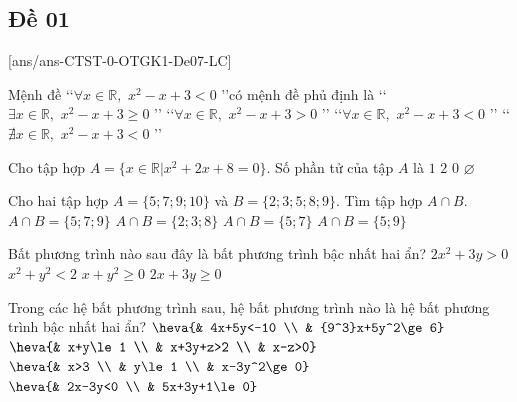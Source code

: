 \subsection{Đề 01}
[ans/ans-CTST-0-OTGK1-De07-LC]
\caulc
\begin{ex}%
	Mệnh đề \lq\lq $\forall x\in \mathbb{R},\,\,x^2-x+3<0$ \rq\rq có mệnh đề phủ định là
	\choice
	{\True  \lq\lq $\exists x \in \mathbb{R},\,\,x^2-x+3\ge 0$ \rq\rq}
	{\lq\lq $\forall x \in \mathbb{R},\,\,x^2-x+3>0$ \rq\rq}
	{\lq\lq $\forall x \in \mathbb{R},\,\,x^2-x+3<0$ \rq\rq}
	{\lq\lq $\nexists x \in \mathbb{R},\,\,x^2-x+3<0$ \rq\rq}
\end{ex}
\begin{ex}%
	Cho tập hợp $A=\{x\in \mathbb{R}|x^2+2x+8=0\}$. Số phần tử của tập $A$ là
	\choice
	{$1$}
	{$2$}
	{\True $0$}
	{$\varnothing$}
\end{ex}
\begin{ex}%
	Cho hai tập hợp $A=\{5;7;9;10\}$ và $B=\{2;3;5;8;9\}$. Tìm tập hợp $A\cap B$.
	\choice
	{$A\cap B=\{5;7;9\}$}
	{$A\cap B=\{2;3;8\}$}
	{$A\cap B=\{5;7\}$}
	{\True $A\cap B=\{5;9\}$}
\end{ex}
\begin{ex}%
	Bất phương trình nào sau đây là bất phương trình bậc nhất hai ẩn?
	\choice
	{$2x^2+3y>0$}
	{$x^2+y^2<2$}
	{$x+y^2\ge 0$}
	{\True $2x+3y\ge 0$}
\end{ex}
\begin{ex}%
	Trong các hệ bất phương trình sau, hệ bất phương trình nào là hệ bất phương trình bậc nhất hai ẩn?
	\choice
	{ $\heva{& 4x+5y<-10 \\
			& {9^3}x+5y^2\ge 6}$ }
	{ $\heva{& x+y\le 1 \\
			& x+3y+z>2 \\
			& x-z>0} $}
	{ $\heva{& x>3 \\
			& y\le 1 \\
			& x-3y^2\ge 0}$}
	{\True $\heva{& 2x-3y<0 \\
			& 5x+3y+1\le 0}$}
\end{ex}

